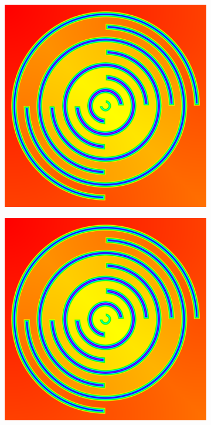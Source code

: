 \documentclass[11pt]{article}       %
\begin{document}
\begin{figure}%
	\centering
	
	\begin{subfigure}[b]{.3\columnwidth}
		\includegraphics[width=\textwidth]{Figures/fmm_7_rings_permeable}
	\end{subfigure}
	\begin{subfigure}[b]{.3\columnwidth}
		\includegraphics[width=\textwidth]{Figures/fim_7_rings_permeable}

\end{subfigure}
\end{figure}
\end{document}
